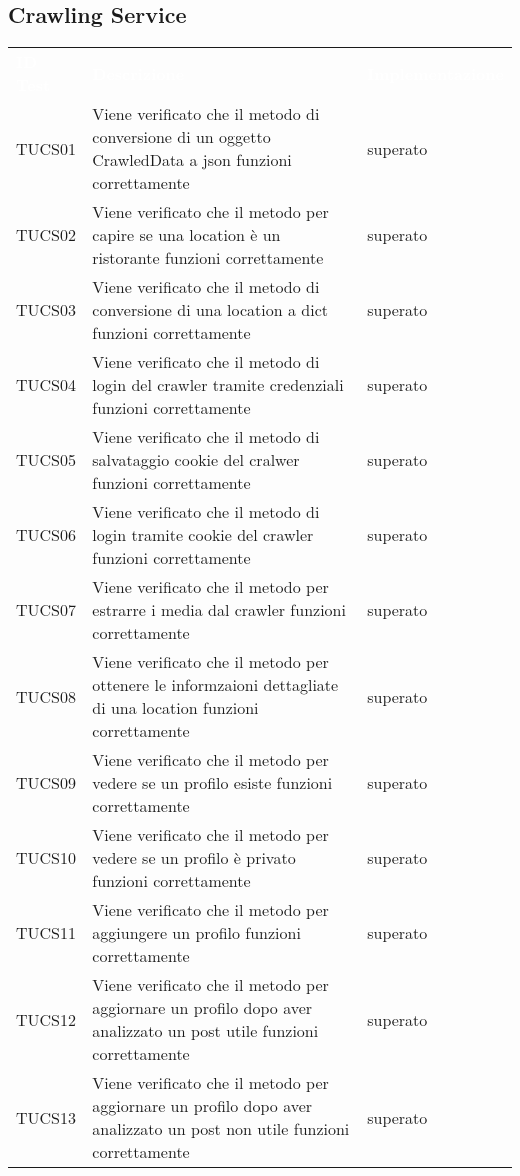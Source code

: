 \subsection{Crawling Service}
\renewcommand{\arraystretch}{1.5}
\begin{longtable}{ m{}<{\centering}  m{}<{\centering}  m{}<{\centering} }
	\rowcolor{darkblue}
	\textcolor{white}{\textbf{ID Test}} &\textcolor{white}{\textbf{Descrizione}} & \textcolor{white}{\textbf{Implementazione}} \\ 

	TUCS01 & Viene verificato che il metodo di conversione di un oggetto CrawledData a json funzioni correttamente & superato \\
    TUCS02 & Viene verificato che il metodo per capire se una location è un ristorante funzioni correttamente  & superato \\
    TUCS03 & Viene verificato che il metodo di conversione di una location a dict funzioni correttamente & superato \\
    TUCS04 & Viene verificato che il metodo di login del crawler tramite credenziali funzioni correttamente & superato \\
    TUCS05 & Viene verificato che il metodo di salvataggio cookie del cralwer funzioni correttamente & superato \\
    TUCS06 & Viene verificato che il metodo di login tramite cookie del crawler funzioni correttamente & superato \\
    TUCS07 & Viene verificato che il metodo per estrarre i media dal crawler funzioni correttamente & superato \\
    TUCS08 & Viene verificato che il metodo per ottenere le informzaioni dettagliate di una location funzioni correttamente & superato \\
    TUCS09 & Viene verificato che il metodo per vedere se un profilo esiste funzioni correttamente & superato \\
    TUCS10 & Viene verificato che il metodo per vedere se un profilo è privato funzioni correttamente & superato \\
    TUCS11 & Viene verificato che il metodo per aggiungere un profilo funzioni correttamente & superato \\
    TUCS12 & Viene verificato che il metodo per aggiornare un profilo dopo aver analizzato un post utile funzioni correttamente & superato \\
    TUCS13 & Viene verificato che il metodo per aggiornare un profilo dopo aver analizzato un post non utile funzioni correttamente & superato \\

\end{longtable}

